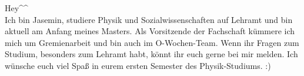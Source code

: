 \begin{multicols}{2}
{
Hey\textasciicircum\textasciicircum \\
Ich bin Jasemin, studiere Physik und Sozialwissenschaften auf Lehramt und bin aktuell am Anfang meines Masters. Als Vorsitzende der Fachschaft kümmere ich mich um Gremienarbeit und bin auch im O-Wochen-Team.
Wenn ihr Fragen zum Studium, besonders zum Lehramt habt, könnt ihr euch gerne bei mir melden.
Ich wünsche euch viel Spaß in eurem ersten Semester des Physik-Studiums. :) 
}




\end{multicols}
